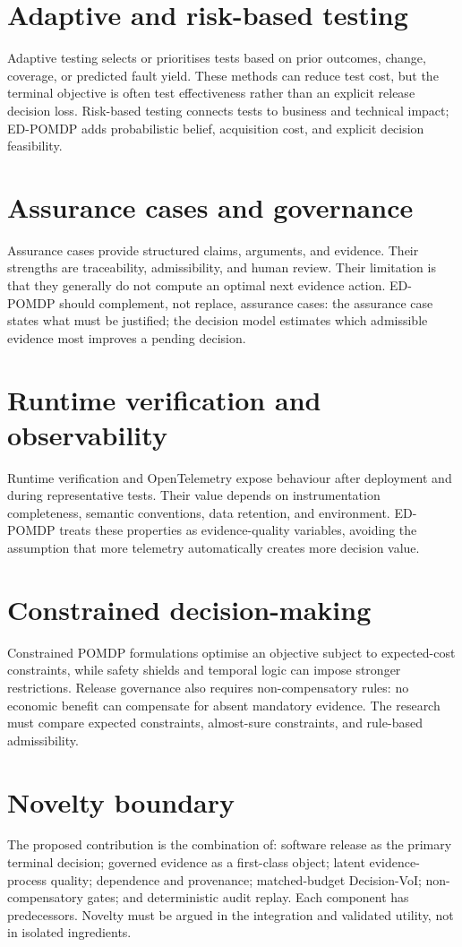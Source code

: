 \documentclass[11pt]{article}
\begin{document}
\section{Adaptive and risk-based testing}
Adaptive testing selects or prioritises tests based on prior outcomes, change, coverage, or predicted fault yield. These methods can reduce test cost, but the terminal objective is often test effectiveness rather than an explicit release decision loss. Risk-based testing connects tests to business and technical impact; ED-POMDP adds probabilistic belief, acquisition cost, and explicit decision feasibility.

\section{Assurance cases and governance}
Assurance cases provide structured claims, arguments, and evidence. Their strengths are traceability, admissibility, and human review. Their limitation is that they generally do not compute an optimal next evidence action. ED-POMDP should complement, not replace, assurance cases: the assurance case states what must be justified; the decision model estimates which admissible evidence most improves a pending decision.

\section{Runtime verification and observability}
Runtime verification and OpenTelemetry expose behaviour after deployment and during representative tests. Their value depends on instrumentation completeness, semantic conventions, data retention, and environment. ED-POMDP treats these properties as evidence-quality variables, avoiding the assumption that more telemetry automatically creates more decision value.

\section{Constrained decision-making}
Constrained POMDP formulations optimise an objective subject to expected-cost constraints, while safety shields and temporal logic can impose stronger restrictions. Release governance also requires non-compensatory rules: no economic benefit can compensate for absent mandatory evidence. The research must compare expected constraints, almost-sure constraints, and rule-based admissibility.

\section{Novelty boundary}
The proposed contribution is the combination of: software release as the primary terminal decision; governed evidence as a first-class object; latent evidence-process quality; dependence and provenance; matched-budget Decision-VoI; non-compensatory gates; and deterministic audit replay. Each component has predecessors. Novelty must be argued in the integration and validated utility, not in isolated ingredients.
\end{document}
